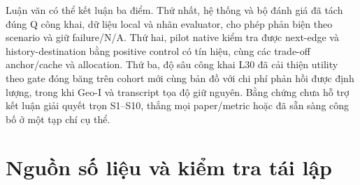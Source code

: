 Luận văn có thể kết luận ba điểm. Thứ nhất, hệ thống và bộ đánh giá đã tách
đúng Q công khai, dữ liệu local và nhãn evaluator, cho phép phản biện theo
scenario và giữ failure/N/A. Thứ hai, pilot native kiểm tra được next-edge và
history-destination bằng positive control có tín hiệu, cùng các trade-off
anchor/cache và allocation. Thứ ba, độ sâu công khai L30 đã cải thiện utility
theo gate đóng băng trên cohort mới cùng bản đồ với chi phí phản hồi được
định lượng, trong khi Geo-I và transcript tọa độ giữ nguyên. Bằng chứng chưa
hỗ trợ kết luận giải quyết trọn S1--S10, thắng mọi paper/metric hoặc đã sẵn
sàng công bố ở một tạp chí cụ thể.

\section{Nguồn số liệu và kiểm tra tái lập}
\label{sec:current-evaluation-provenance}
\begingroup\small\raggedright

